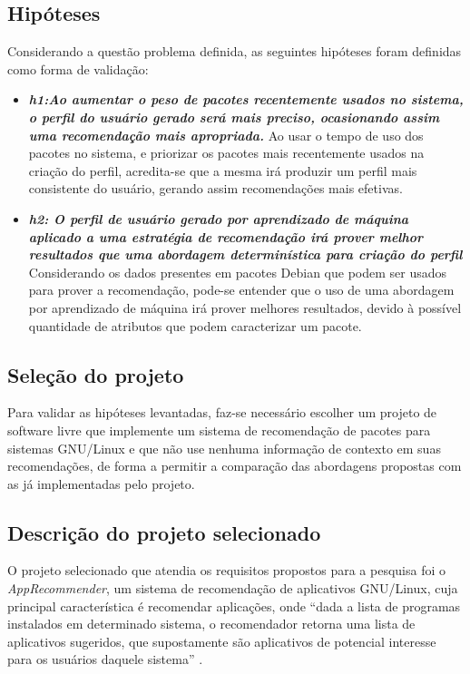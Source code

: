   \subsection{Hipóteses} \label{sec:hipoteses}

  Considerando a questão problema definida, as seguintes hipóteses foram definidas
  como forma de validação:

  \begin{itemize} \item \textit{\textbf{h1:Ao aumentar o peso de pacotes
  recentemente usados no sistema, o perfil do usuário gerado será mais preciso,
  ocasionando assim uma recomendação mais apropriada.}} Ao usar o tempo de uso dos
  pacotes no sistema, e priorizar os pacotes mais recentemente usados na criação
  do perfil, acredita-se que a mesma irá produzir um perfil mais
  consistente do usuário, gerando assim recomendações mais efetivas.\item
  \textit{\textbf{h2: O perfil de usuário gerado por aprendizado de máquina aplicado a uma
  estratégia de recomendação irá prover melhor resultados que uma abordagem
  determinística para criação do perfil}}
  Considerando os dados presentes em pacotes Debian que podem ser
  usados para prover a recomendação, pode-se entender que o uso de uma abordagem
  por aprendizado de máquina irá prover melhores resultados, devido à possível
  quantidade de atributos que podem caracterizar um pacote.
  \end{itemize}

  \subsection{Seleção do projeto}

  Para validar as hipóteses levantadas, faz-se necessário escolher um projeto de
  software livre que implemente um sistema de recomendação de pacotes
  para sistemas GNU/Linux e que não use nenhuma informação de contexto em suas
  recomendações, de forma a permitir a comparação das abordagens propostas com as
  já implementadas pelo projeto.

  \subsection{Descrição do projeto selecionado}

  O projeto selecionado que atendia os requisitos propostos para a pesquisa foi o
  \textit{AppRecommender}, um sistema de recomendação de aplicativos GNU/Linux,
  cuja principal característica é recomendar aplicações,
  onde “dada a lista de programas instalados em determinado sistema, o recomendador retorna uma lista de aplicativos
  sugeridos, que supostamente são aplicativos de potencial interesse para os usuários daquele sistema”
  \cite{araujo2011apprecommender}.


